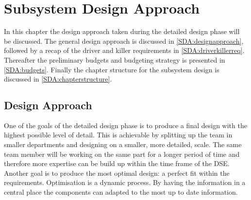 \chapter{Subsystem Design Approach}
\label{ch:BudgetBreakdown}







In this chapter the design approach taken during the detailed design phase will be discussed. The general design approach is discussed in \autoref{SDA:designapproach}, followed by a recap of the driver and killer requirements in \autoref{SDA:driverkillerreq}. Thereafter the preliminary budgets and budgeting strategy is presented in \autoref{SDA:budgets}. Finally the chapter structure for the subsystem design is discussed in \autoref{SDA:chapterstructure}.




\section{Design Approach} \label{SDA:designapproach}
One of the goals of the detailed design phase is to produce a final design with the highest possible level of detail. This is achievable by splitting up the team in smaller departments and designing on a smaller, more detailed, scale. The same team member will be working on the same part for a longer period of time and therefore more expertise can be build up within the time frame of the DSE. Another goal is to produce the most optimal design: a perfect fit within the requirements. Optimisation is a dynamic process. By having the information in a central place the components can adapted to the most up to date information.


